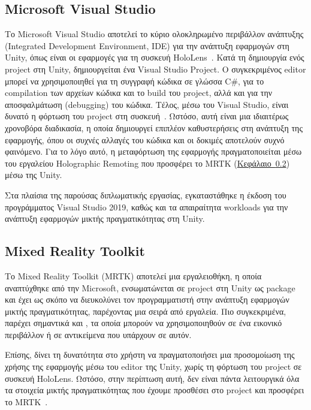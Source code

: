\subsection{Microsoft Visual Studio}
Το Microsoft Visual Studio αποτελεί το κύριο ολοκληρωμένο περιβάλλον ανάπτυξης (Integrated Development Environment, IDE) για την ανάπτυξη εφαρμογών στη Unity, όπως είναι οι εφαρμογές για τη συσκευή HoloLens~\cite{thetuvix_2023_install}. Κατά τη δημιουργία ενός project στη Unity, δημιουργείται ένα Visual Studio Project. Ο συγκεκριμένος editor μπορεί να χρησιμοποιηθεί για τη συγγραφή κώδικα σε γλώσσα C\#, για το compilation των αρχείων κώδικα και το build του project, αλλά και για την αποσφαλμάτωση (debugging) του κώδικα. Τέλος, μέσω του Visual Studio, είναι δυνατό η φόρτωση του project στη συσκευή~\cite{vtieto_2022_using}. Ωστόσο, αυτή είναι μια ιδιαιτέρως χρονοβόρα διαδικασία, η οποία δημιουργεί επιπλέον καθυστερήσεις στη ανάπτυξη της εφαρμογής, όπου οι συχνές αλλαγές του κώδικα και οι δοκιμές αποτελούν συχνό φαινόμενο. Για το λόγο αυτό, η μεταφόρτωση της εφαρμογής πραγματοποιείται μέσω του εργαλείου Holographic Remoting που προσφέρει το MRTK (\hyperref[subsec:mrtk]{Κεφάλαιο~\ref*{subsec:mrtk}}) μέσω της Unity.

Στα πλαίσια της παρούσας διπλωματικής εργασίας, εγκαταστάθηκε η έκδοση του προγράμματος Visual Studio 2019, καθώς και τα απαιραίτητα workloads για την ανάπτυξη εφαρμογών μικτής πραγματικότητας στη Unity.

\subsection{Mixed Reality Toolkit}\label{subsec:mrtk}
Το Mixed Reality Toolkit (MRTK) αποτελεί μια εργαλειοθήκη, η οποία αναπτύχθηκε από την Microsoft, ενσωματώνεται σε project στη Unity ως package και έχει ως σκόπο να διευκολύνει τον προγραμματιστή στην ανάπτυξη εφαρμογών μικτής πραγματικότητας, παρέχοντας μια σειρά από εργαλεία. Πιο συγκεκριμένα, παρέχει σημαντικά  και , τα οποία μπορούν να χρησιμοποιηθούν σε ένα εικονικό περιβάλλον ή σε αντικείμενα που υπάρχουν σε αυτόν.

Επίσης, δίνει τη δυνατότητα στο χρήστη να πραγματοποιήσει μια προσομοίωση της χρήσης της εφαρμογής μέσω του editor της Unity, χωρίς τη φόρτωση του project σε συσκευή HoloLens. Ωστόσο, στην περίπτωση αυτή, δεν είναι πάντα λειτουργικά όλα τα στοιχεία μικτής πραγματικότητας που έχουμε προσθέσει στο project και προσφέρει το MRTK~\cite{polarkev_2022_mrtk2unity}.

